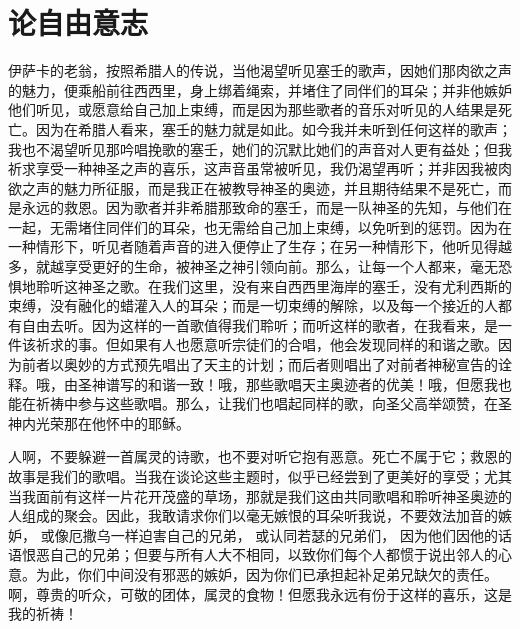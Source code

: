 
\chapter{论自由意志}


 伊萨卡的老翁，按照希腊人的传说，当他渴望听见塞壬的歌声，因她们那肉欲之声的魅力，便乘船前往西西里，身上绑着绳索，并堵住了同伴们的耳朵；并非他嫉妒他们听见，或愿意给自己加上束缚，而是因为那些歌者的音乐对听见的人结果是死亡。因为在希腊人看来，塞壬的魅力就是如此。如今我并未听到任何这样的歌声；我也不渴望听见那吟唱挽歌的塞壬，她们的沉默比她们的声音对人更有益处；但我祈求享受一种神圣之声的喜乐，这声音虽常被听见，我仍渴望再听；并非因我被肉欲之声的魅力所征服，而是我正在被教导神圣的奥迹，并且期待结果不是死亡，而是永远的救恩。因为歌者并非希腊那致命的塞壬，而是一队神圣的先知，与他们在一起，无需堵住同伴们的耳朵，也无需给自己加上束缚，以免听到的惩罚。因为在一种情形下，听见者随着声音的进入便停止了生存；在另一种情形下，他听见得越多，就越享受更好的生命，被神圣之神引领向前。那么，让每一个人都来，毫无恐惧地聆听这神圣之歌。在我们这里，没有来自西西里海岸的塞壬，没有尤利西斯的束缚，没有融化的蜡灌入人的耳朵；而是一切束缚的解除，以及每一个接近的人都有自由去听。因为这样的一首歌值得我们聆听；而听这样的歌者，在我看来，是一件该祈求的事。但如果有人也愿意听宗徒们的合唱，他会发现同样的和谐之歌。因为前者以奥妙的方式预先唱出了天主的计划；而后者则唱出了对前者神秘宣告的诠释。哦，由圣神谱写的和谐一致！哦，那些歌唱天主奥迹者的优美！哦，但愿我也能在祈祷中参与这些歌唱。那么，让我们也唱起同样的歌，向圣父高举颂赞，在圣神内光荣那在他怀中的耶稣。\par

人啊，不要躲避一首属灵的诗歌，也不要对听它抱有恶意。死亡不属于它；救恩的故事是我们的歌唱。当我在谈论这些主题时，似乎已经尝到了更美好的享受；尤其当我面前有这样一片花开茂盛的草场，那就是我们这由共同歌唱和聆听神圣奥迹的人组成的聚会。因此，我敢请求你们以毫无嫉恨的耳朵听我说，不要效法加音的嫉妒， 或像厄撒乌一样迫害自己的兄弟， 或认同若瑟的兄弟们， 因为他们因他的话语恨恶自己的兄弟；但要与所有人大不相同，以致你们每个人都惯于说出邻人的心意。为此，你们中间没有邪恶的嫉妒，因为你们已承担起补足弟兄缺欠的责任。啊，尊贵的听众，可敬的团体，属灵的食物！但愿我永远有份于这样的喜乐，这是我的祈祷！\par

